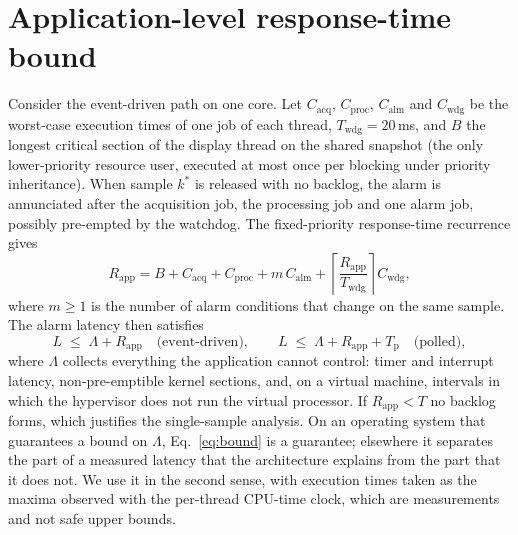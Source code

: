 \documentclass[preprint,3p,10pt]{elsarticle}
\begin{document}
\section{Application-level response-time bound}
\label{sec:rta}
Consider the event-driven path on one core. Let $C_{\mathrm{acq}}$, $C_{\mathrm{proc}}$, $C_{\mathrm{alm}}$ and $C_{\mathrm{wdg}}$ be the worst-case execution times of one job of each thread, $T_{\mathrm{wdg}}=20$\,ms, and $B$ the longest critical section of the display thread on the shared snapshot (the only lower-priority resource user, executed at most once per blocking under priority inheritance). When sample $k^\ast$ is released with no backlog, the alarm is annunciated after the acquisition job, the processing job and one alarm job, possibly pre-empted by the watchdog. The fixed-priority response-time recurrence \cite{joseph1986,audsley1993} gives
\begin{equation}
R_{\mathrm{app}} = B + C_{\mathrm{acq}} + C_{\mathrm{proc}} + m\,C_{\mathrm{alm}} + \left\lceil \frac{R_{\mathrm{app}}}{T_{\mathrm{wdg}}} \right\rceil C_{\mathrm{wdg}},
\label{eq:rta}
\end{equation}
where $m\ge 1$ is the number of alarm conditions that change on the same sample. The alarm latency then satisfies
\begin{equation}
L \;\le\; \Lambda + R_{\mathrm{app}} \quad\text{(event-driven)}, \qquad L \;\le\; \Lambda + R_{\mathrm{app}} + T_{\mathrm p} \quad\text{(polled)},
\label{eq:bound}
\end{equation}
where $\Lambda$ collects everything the application cannot control: timer and interrupt latency, non-pre-emptible kernel sections, and, on a virtual machine, intervals in which the hypervisor does not run the virtual processor. If $R_{\mathrm{app}}<T$ no backlog forms, which justifies the single-sample analysis. On an operating system that guarantees a bound on $\Lambda$, Eq.~\eqref{eq:bound} is a guarantee; elsewhere it separates the part of a measured latency that the architecture explains from the part that it does not. We use it in the second sense, with execution times taken as the maxima observed with the per-thread CPU-time clock, which are measurements and not safe upper bounds.
\end{document}
